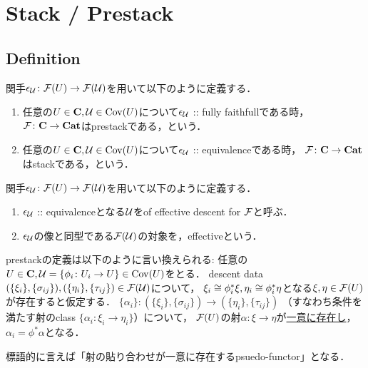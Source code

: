 \documentclass[a4paper]{jsarticle}
\begin{document}
\section{Stack / Prestack}
\subsection{Definition}
\begin{Def}
    関手$\epsilon_{\mathcal{U}} \colon \mathcal{F}(U) \to \mathcal{F}(\mathcal{U})$を用いて以下のように定義する．
    \begin{enumerate}[label=(\roman*)]
    \item
        任意の$U \in \mathbf{C}, \mathcal{U} \in \operatorname{Cov}(U)$について$\epsilon_{\mathcal{U}}$ :: fully faithfullである時，
        $\mathcal{F} \colon \mathbf{C} \to \mathbf{Cat}$はprestackである，という．
    \item
        任意の$U \in \mathbf{C}, \mathcal{U} \in \operatorname{Cov}(U)$について$\epsilon_{\mathcal{U}}$ :: equivalenceである時，
        $\mathcal{F} \colon \mathbf{C} \to \mathbf{Cat}$はstackである，という．
    \end{enumerate}
\end{Def}

\begin{Def}
    関手$\epsilon_{\mathcal{U}} \colon \mathcal{F}(U) \to \mathcal{F}(\mathcal{U})$を用いて以下のように定義する．
    \begin{enumerate}[label=(\roman*)]
        \item
            $\epsilon_{\mathcal{U}}$ :: equivalenceとなる$\mathcal{U}$をof effective descent for $\mathcal{F}$と呼ぶ．
        \item
            $\epsilon_{\mathcal{U}}$の像と同型である$\mathcal{F}(\mathcal{U})$の対象を，effectiveという．
    \end{enumerate}
\end{Def}

\begin{Remark}
    prestackの定義は以下のように言い換えられる:
    任意の$U \in \mathbf{C}, \mathcal{U}=\{\phi_i \colon U_i \to U\} \in \operatorname{Cov}(U)$をとる．
    descent data $(\{\xi_i\}, \{\sigma_{ij}\}), (\{\eta_i\}, \{\tau_{ij}\}) \in \mathcal{F}(\mathcal{U})$について，
    $\xi_i \cong \phi_i^*\xi, \eta_i \cong \phi_i^*\eta$となる$\xi, \eta \in \mathcal{F}(U)$が存在すると仮定する．
    $\{\alpha_i\} \colon (\{\xi_i\}, \{\sigma_{ij}\}) \to (\{\eta_i\}, \{\tau_{ij}\})$
    （すなわち条件を満たす射のclass $\{\alpha_i \colon \xi_i \to \eta_i\}$）について，
    $\mathcal{F}(U)$の射$\alpha \colon \xi \to \eta$が\underline{一意に存在し}，
    $\alpha_i=\phi^*\alpha$となる．

    標語的に言えば「射の貼り合わせが一意に存在するpsuedo-functor」となる．
\end{Remark}
\end{document}
